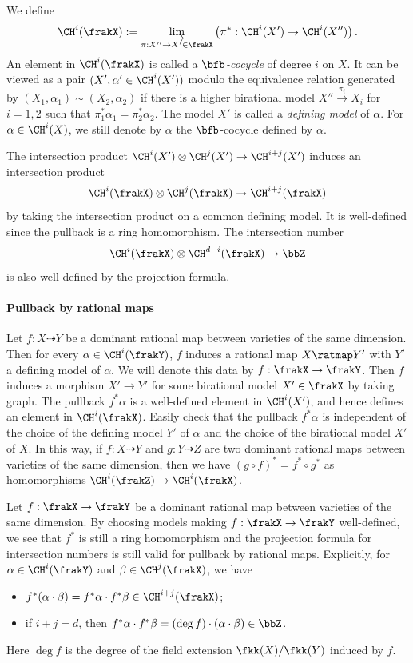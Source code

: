 \begin{definition}
	We define
	\[ \CH^i(\frakX) := \varinjlim_{\pi:X'' \to X' \in \frakX} \left( \pi^* : \CH^i(X') \to \CH^i(X'') \right). \]
	An element in $\CH^i(\frakX)$ is called a \emph{$\bfb$-cocycle} of degree $i$ on $X$.
	It can be viewed as a pair $(X', \alpha' \in \CH^i(X'))$ modulo the equivalence relation generated by $(X_1, \alpha_1) \sim (X_2, \alpha_2)$ if there is a higher birational model $X'' \xrightarrow{\pi_i} X_i$ for $i=1,2$ such that $\pi_1^* \alpha_1 = \pi_2^* \alpha_2$.
	The model $X'$ is called a \emph{defining model} of $\alpha$.
	For $\alpha \in \CH^i(X)$, we still denote by $\alpha$ the $\bfb$-cocycle defined by $\alpha$.
\end{definition}

The intersection product $\CH^i(X') \otimes \CH^j(X') \to \CH^{i+j}(X')$ induces an intersection product
\[ \CH^i(\frakX) \otimes \CH^j(\frakX) \to \CH^{i+j}(\frakX) \]
by taking the intersection product on a common defining model.
It is well-defined since the pullback is a ring homomorphism.
The intersection number
\[ \CH^i(\frakX) \otimes \CH^{d-i}(\frakX) \to \bbZ \]
is also well-defined by the projection formula.

\paragraph{Pullback by rational maps}
Let $f: X \dashrightarrow Y$ be a dominant rational map between varieties of the same dimension.
Then for every $\alpha \in \CH^i(\frakY)$, $f$ induces a rational map $X \ratmap Y'$ with $Y'$ a defining model of $\alpha$.
We will denote this data by $f: \frakX \to \frakY$.
Then $f$ induces a morphism $X' \to Y'$ for some birational model $X' \in \frakX$ by taking graph.
The pullback $f^* \alpha$ is a well-defined element in $\CH^i(X')$, and hence defines an element in $\CH^i(\frakX)$.
Easily check that the pullback $f^* \alpha$ is independent of the choice of the defining model $Y'$ of $\alpha$ and the choice of the birational model $X'$ of $X$.
In this way, if $f: X \dashrightarrow Y$ and $g: Y \dashrightarrow Z$ are two dominant rational maps between varieties of the same dimension, then we have $(g \circ f)^* = f^* \circ g^*$ as homomorphisms $\CH^i(\frakZ) \to \CH^i(\frakX)$.

Let $f: \frakX \to \frakY$ be a dominant rational map between varieties of the same dimension.
By choosing models making $f: \frakX \to \frakY$ well-defined, we see that $f^*$ is still a ring homomorphism and the projection formula for intersection numbers is still valid for pullback by rational maps.
Explicitly, for $\alpha \in \CH^i(\frakY)$ and $\beta \in \CH^{j}(\frakX)$, we have
\begin{itemize}
	\item $f^*(\alpha \cdot \beta) = f^* \alpha \cdot f^* \beta \in \CH^{i+j}(\frakX)$;
	\item if $i+j = d$, then $f^* \alpha \cdot f^* \beta = (\deg f) \cdot (\alpha \cdot \beta) \in \bbZ$.
\end{itemize}
Here $\deg f$ is the degree of the field extension $\fkk(X)/\fkk(Y)$ induced by $f$.

